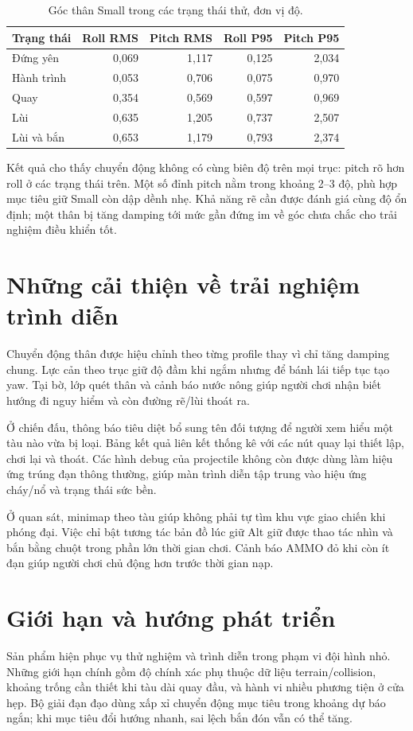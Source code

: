 \documentclass[11pt,a4paper,oneside]{report}
\begin{document}
\begin{table}[H]\centering\small
\caption{Góc thân Small trong các trạng thái thử, đơn vị độ.}
\begin{tabular}{@{}lrrrr@{}}\toprule
\textbf{Trạng thái}&\textbf{Roll RMS}&\textbf{Pitch RMS}&\textbf{Roll P95}&\textbf{Pitch P95}\\\midrule
Đứng yên&0,069&1,117&0,125&2,034\\
Hành trình&0,053&0,706&0,075&0,970\\
Quay&0,354&0,569&0,597&0,969\\
Lùi&0,635&1,205&0,737&2,507\\
Lùi và bắn&0,653&1,179&0,793&2,374\\\bottomrule
\end{tabular}\end{table}

Kết quả cho thấy chuyển động không có cùng biên độ trên mọi trục: pitch rõ hơn roll ở các trạng thái trên. Một số đỉnh pitch nằm trong khoảng 2--3 độ, phù hợp mục tiêu giữ Small còn dập dềnh nhẹ. Khả năng rẽ cần được đánh giá cùng độ ổn định; một thân bị tăng damping tới mức gần đứng im về góc chưa chắc cho trải nghiệm điều khiển tốt.

\section{Những cải thiện về trải nghiệm trình diễn}
Chuyển động thân được hiệu chỉnh theo từng profile thay vì chỉ tăng damping chung. Lực cản theo trục giữ độ đầm khi ngắm nhưng để bánh lái tiếp tục tạo yaw. Tại bờ, lớp quét thân và cảnh báo nước nông giúp người chơi nhận biết hướng đi nguy hiểm và còn đường rẽ/lùi thoát ra.

Ở chiến đấu, thông báo tiêu diệt bổ sung tên đối tượng để người xem hiểu một tàu nào vừa bị loại. Bảng kết quả liên kết thống kê với các nút quay lại thiết lập, chơi lại và thoát. Các hình debug của projectile không còn được dùng làm hiệu ứng trúng đạn thông thường, giúp màn trình diễn tập trung vào hiệu ứng cháy/nổ và trạng thái sức bền.

Ở quan sát, minimap theo tàu giúp không phải tự tìm khu vực giao chiến khi phóng đại. Việc chỉ bật tương tác bản đồ lúc giữ Alt giữ được thao tác nhìn và bắn bằng chuột trong phần lớn thời gian chơi. Cảnh báo AMMO đỏ khi còn ít đạn giúp người chơi chủ động hơn trước thời gian nạp.

\section{Giới hạn và hướng phát triển}
Sản phẩm hiện phục vụ thử nghiệm và trình diễn trong phạm vi đội hình nhỏ. Những giới hạn chính gồm độ chính xác phụ thuộc dữ liệu terrain/collision, khoảng trống cần thiết khi tàu dài quay đầu, và hành vi nhiều phương tiện ở cửa hẹp. Bộ giải đạn đạo dùng xấp xỉ chuyển động mục tiêu trong khoảng dự báo ngắn; khi mục tiêu đổi hướng nhanh, sai lệch bắn đón vẫn có thể tăng.
\end{document}

